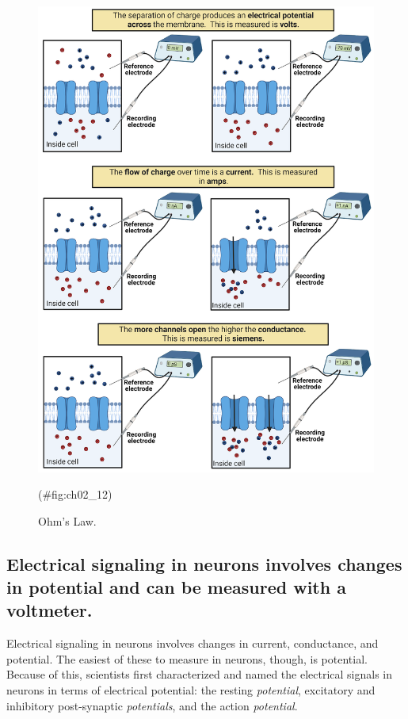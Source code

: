 \documentclass[
]{book}
\begin{document}
\begin{figure}

{\centering \includegraphics[width=0.8\linewidth]{images/ch02/02_12} 

}

\caption{Ohm's Law.}(\#fig:ch02_12)
\end{figure}

\hypertarget{electrical-signaling-in-neurons-involves-changes-in-potential-and-can-be-measured-with-a-voltmeter.}{%
\subsection{Electrical signaling in neurons involves changes in potential and can be measured with a voltmeter.}\label{electrical-signaling-in-neurons-involves-changes-in-potential-and-can-be-measured-with-a-voltmeter.}}

Electrical signaling in neurons involves changes in current, conductance, and potential. The easiest of these to measure in neurons, though, is potential. Because of this, scientists first characterized and named the electrical signals in neurons in terms of electrical potential: the resting \emph{potential}, excitatory and inhibitory post-synaptic \emph{potentials}, and the action \emph{potential}.
\end{document}
